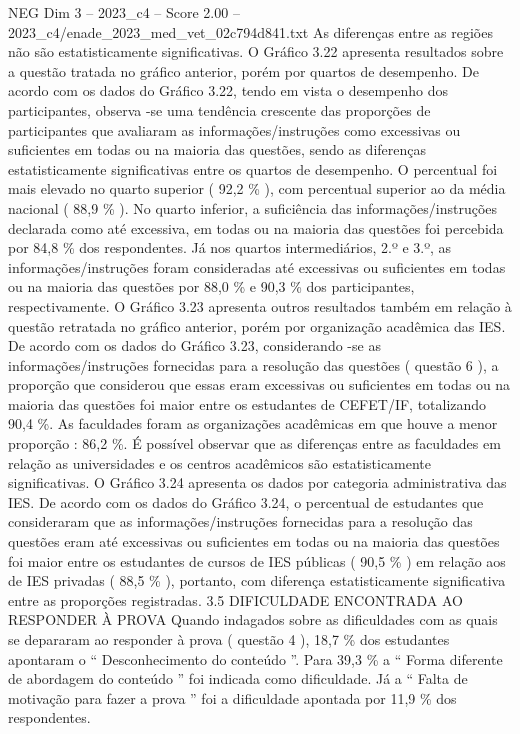 \begin{textsample}{NEG Dim 3 – 2023\_c4 – Score 2.00 – 2023\_c4/enade\_2023\_med\_vet\_02c794d841.txt}
As diferenças entre as regiões não são estatisticamente significativas.
O Gráfico 3.22 apresenta resultados sobre a questão tratada no gráfico anterior, porém por quartos de desempenho.
De acordo com os dados do Gráfico 3.22, tendo em vista o desempenho dos participantes, observa -se uma tendência crescente das proporções de participantes que avaliaram as informações/instruções como excessivas ou suficientes em todas ou na maioria das questões, sendo as diferenças estatisticamente significativas entre os quartos de desempenho.
O percentual foi mais elevado no quarto superior ( 92,2 \% ), com percentual superior ao da média nacional ( 88,9 \% ).
No quarto inferior, a suficiência das informações/instruções declarada como até excessiva, em todas ou na maioria das questões foi percebida por 84,8 \% dos respondentes.
Já nos quartos intermediários, 2.º e 3.º, as informações/instruções foram consideradas até excessivas ou suficientes em todas ou na maioria das questões por 88,0 \% e 90,3 \% dos participantes, respectivamente.
O Gráfico 3.23 apresenta outros resultados também em relação à questão retratada no gráfico anterior, porém por organização acadêmica das IES.
De acordo com os dados do Gráfico 3.23, considerando -se as informações/instruções fornecidas para a resolução das questões ( questão 6 ), a proporção que considerou que essas eram excessivas ou suficientes em todas ou na maioria das questões foi maior entre os estudantes de CEFET/IF, totalizando 90,4 \%.
As faculdades foram as organizações acadêmicas em que houve a menor proporção : 86,2 \%.
É possível observar que as diferenças entre as faculdades em relação as universidades e os centros acadêmicos são estatisticamente significativas.
O Gráfico 3.24 apresenta os dados por categoria administrativa das IES.
De acordo com os dados do Gráfico 3.24, o percentual de estudantes que consideraram que as informações/instruções fornecidas para a resolução das questões eram até excessivas ou suficientes em todas ou na maioria das questões foi maior entre os estudantes de cursos de IES públicas ( 90,5 \% ) em relação aos de IES privadas ( 88,5 \% ), portanto, com diferença estatisticamente significativa entre as proporções registradas. 3.5 DIFICULDADE ENCONTRADA AO RESPONDER À PROVA Quando indagados sobre as dificuldades com as quais se depararam ao responder à prova ( questão 4 ), 18,7 \% dos estudantes apontaram o “ Desconhecimento do conteúdo ”.
Para 39,3 \% a “ Forma diferente de abordagem do conteúdo ” foi indicada como dificuldade.
Já a “ Falta de motivação para fazer a prova ” foi a dificuldade apontada por 11,9 \% dos respondentes.

\end{textsample}
